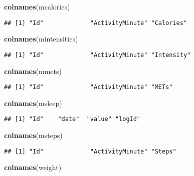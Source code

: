\documentclass[
]{article}
\newenvironment{Shaded}{\begin{snugshade}}{\end{snugshade}}
\newcommand{\FunctionTok}[1]{\textcolor[rgb]{0.13,0.29,0.53}{\textbf{#1}}}
\newcommand{\NormalTok}[1]{#1}
\begin{document}
\begin{Shaded}
\begin{Highlighting}[]
\FunctionTok{colnames}\NormalTok{(mcalories)}
\end{Highlighting}
\end{Shaded}

\begin{verbatim}
## [1] "Id"             "ActivityMinute" "Calories"
\end{verbatim}

\begin{Shaded}
\begin{Highlighting}[]
\FunctionTok{colnames}\NormalTok{(mintensities)}
\end{Highlighting}
\end{Shaded}

\begin{verbatim}
## [1] "Id"             "ActivityMinute" "Intensity"
\end{verbatim}

\begin{Shaded}
\begin{Highlighting}[]
\FunctionTok{colnames}\NormalTok{(mmets)}
\end{Highlighting}
\end{Shaded}

\begin{verbatim}
## [1] "Id"             "ActivityMinute" "METs"
\end{verbatim}

\begin{Shaded}
\begin{Highlighting}[]
\FunctionTok{colnames}\NormalTok{(msleep)}
\end{Highlighting}
\end{Shaded}

\begin{verbatim}
## [1] "Id"    "date"  "value" "logId"
\end{verbatim}

\begin{Shaded}
\begin{Highlighting}[]
\FunctionTok{colnames}\NormalTok{(msteps)}
\end{Highlighting}
\end{Shaded}

\begin{verbatim}
## [1] "Id"             "ActivityMinute" "Steps"
\end{verbatim}

\begin{Shaded}
\begin{Highlighting}[]
\FunctionTok{colnames}\NormalTok{(weight)}
\end{Highlighting}
\end{Shaded}
\end{document}
